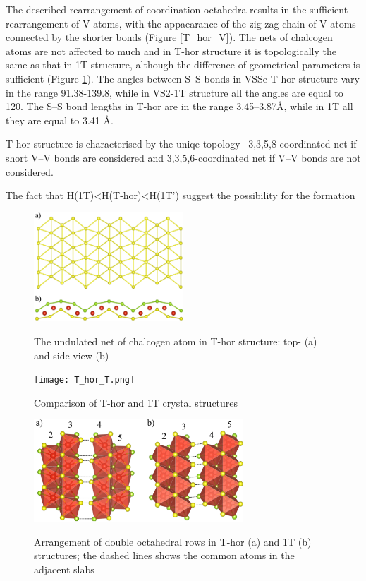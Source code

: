 \documentclass[a4paperm]{article}
\begin{document}
The described rearrangement of coordination octahedra results in the sufficient rearrangement of V atoms, with the appaearance of the zig-zag chain of V atoms connected by the shorter bonds (Figure \ref{T_hor_V}).
The nets of chalcogen atoms are not affected to much and in T-hor structure it is topologically the same as that in 1T structure, although the difference of geometrical parameters is sufficient (Figure \ref{T_hor_hcb}).
The angles between S--S bonds in VSSe-T-hor structure vary in the range 91.38-139.8\textdegree, while in VS2-1T structure all the angles are equal to 120\textdegree.
The S--S bond lengths in T-hor are in the range 3.45--3.87\AA, while in 1T all they are equal to 3.41 \AA.

T-hor structure is characterised by the uniqe topology– 3,3,5,8-coordinated net if short V--V bonds are considered and 3,3,5,6-coordinated net if V--V bonds are not considered.

The fact that H(1T)<H(T-hor)<H(1T') suggest the possibility for the formation

\begin{figure}[H]
        \includegraphics[width=0.5\textwidth]{T_hor_hcb.png} \\
        \caption{The undulated net of chalcogen atom in T-hor structure: top- (a) and side-view (b)}
\label{T_hor_hcb}
\end{figure}


\begin{figure}[H]
	\texttt{[image: T\_hor\_T.png]} \\
	\caption{Comparison of T-hor and 1T crystal structures}
	\label{T_hor_T}
\end{figure}

\begin{figure}[H]
	\includegraphics[width=0.7\textwidth]{T_hor_slabs.png} \\
	\caption{Arrangement of double octahedral rows in T-hor (a) and 1T (b) structures; the dashed lines shows the common atoms in the adjacent slabs}
	\label{T_hor_slabs}
\end{figure}
\end{document}
